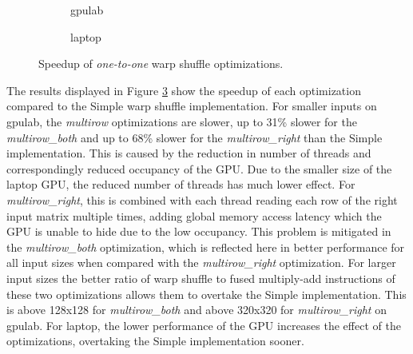 \begin{figure}[ht]
	\centering	
	\begin{subfigure}{0.4\textwidth}
		\centering
		\def\svgwidth{\textwidth}
		
		\caption{gpulab}
		\label{fig:warp_shuffle_one_to_one_results_gpulab}
	\end{subfigure}
	\begin{subfigure}{0.4\textwidth}
		\centering
		\def\svgwidth{\textwidth}
		
		\caption{laptop}
		\label{fig:warp_shuffle_one_to_one_results_laptop}
	\end{subfigure}

	
	\caption{Speedup of \textit{one-to-one} warp shuffle optimizations.}
	\label{fig:warp_shuffle_one_to_one_results}
\end{figure}

The results displayed in Figure \ref{fig:warp_shuffle_one_to_one_results} show the speedup of each optimization compared to the Simple warp shuffle implementation. For smaller inputs on gpulab, the \textit{multirow} optimizations are slower, up to 31\% slower for the \textit{multirow\_both} and up to 68\% slower for the \textit{multirow\_right} than the Simple implementation. This is caused by the reduction in number of threads and correspondingly reduced occupancy of the GPU. Due to the smaller size of the laptop GPU, the reduced number of threads has much lower effect. For \textit{multirow\_right}, this is combined with each thread reading each row of the right input matrix multiple times, adding global memory access latency which the GPU is unable to hide due to the low occupancy. This problem is mitigated in the \textit{multirow\_both} optimization, which is reflected here in better performance for all input sizes when compared with the \textit{multirow\_right} optimization. For larger input sizes the better ratio of warp shuffle to fused multiply-add instructions of these two optimizations allows them to overtake the Simple implementation. This is above 128x128 for \textit{multirow\_both} and above 320x320 for \textit{multirow\_right} on gpulab. For laptop, the lower performance of the GPU increases the effect of the optimizations, overtaking the Simple implementation sooner. 

